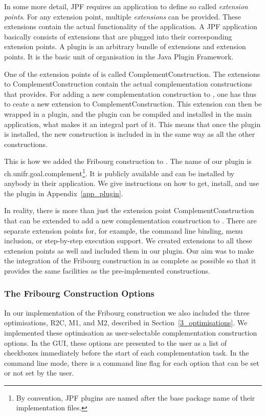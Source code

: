 In some more detail, JPF requires an application to define so called \textit{extension points}. For any extension point, multiple \textit{extensions} can be provided. These extensions contain the actual functionality of the application. A JPF application basically consists of extensions that are plugged into their corresponding extension points. A plugin is an arbitrary bundle of extensions and extension points. It is the basic unit of organisation in the Java Plugin Framework.

One of the extension points of \goal{} is called \textsf{ComplementConstruction}. The extensions to \textsf{ComplementConstruction} contain the actual complementation constructions that \goal{} provides. For adding a new complementation construction to \goal, one has thus to ceate a new extension to \textsf{ComplementConstruction}. This extension can then be wrapped in a plugin, and the plugin can be compiled and installed in the main application, what makes it an integral part of it. This means that once the plugin is installed, the new construction is included in \goal{} in the same way as all the other constructions.

This is how we added the Fribourg construction to \goal. The name of our plugin is \textsf{ch.unifr.goal.complement}\footnote{By convention, JPF plugins are named after the base package name of their implementation files.}. It is publicly available and can be installed by anybody in their \goal{} application. We give instructions on how to get, install, and use the plugin in Appendix~\ref{app_plugin}.

In reality, there is more than just the extension point \textsf{ComplementConstruction} that can be extended to add a new complementation construction to \goal. There are separate extension points for, for example, the command line binding, menu inclusion, or step-by-step execution support. We created extensions to all these extension points as well and included them in our plugin. Our aim was to make the integration of the Fribourg construction in \goal{} as complete as possible so that it provides the same facilities as the pre-implemented constructions.

\subsubsection{The Fribourg Construction Options}
In our implementation of the Fribourg construction we also included the three optimisations, R2C, M1, and M2, described in Section~\ref{3_optimisations}. We implemented these optimisation as user-selectable complementation construction options. In the GUI, these options are presented to the user as a list of checkboxes immediately before the start of each complementation task. In the command line mode, there is a command line flag for each option that can be set or not set by the user.

